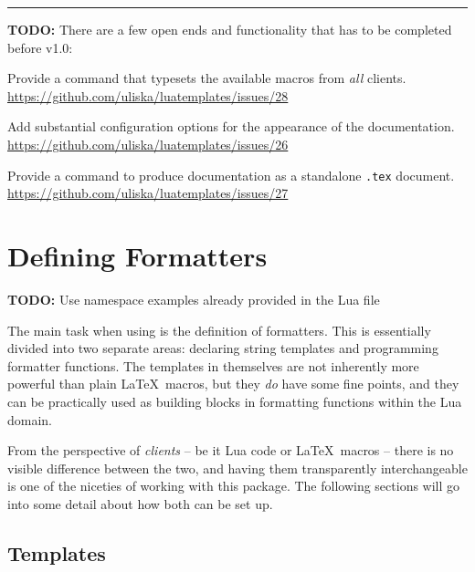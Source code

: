 \documentclass{scrartcl}
\begin{document}
\begin{quote}
\end{quote}

\bigskip

\hrule

\bigskip

\noindent \textbf{TODO:} There are a few open ends and functionality that has to be completed before v1.0:

\begin{itemize*}
\item Provide a command that typesets the available macros from \emph{all} clients.\\
\url{https://github.com/uliska/luatemplates/issues/28}
\item Add substantial configuration options for the appearance of the documentation.\\
\url{https://github.com/uliska/luatemplates/issues/26}
\item Provide a command to produce documentation as a standalone \texttt{.tex} document.\\
\url{https://github.com/uliska/luatemplates/issues/27}
\end{itemize*}


\section{Defining Formatters}
\label{sec:defining-formatters}

\textbf{TODO:} Use namespace examples already provided in the Lua file

The main task when using  is the definition of formatters.
This is essentially divided into two separate areas: declaring string templates
and programming formatter functions.  The templates in themselves are not
inherently more powerful than plain \LaTeX\ macros, but they \emph{do} have
some fine points, and they can be practically used as building blocks in
formatting functions within the Lua domain.

From the perspective of \emph{clients} -- be it Lua code or \LaTeX\ macros --
there is no visible difference between the two, and having them transparently
interchangeable is one of the niceties of working with this package.  The
following sections will go into some detail about how both can be set up.


\subsection{Templates}
\label{sec:templates}
\end{document}
